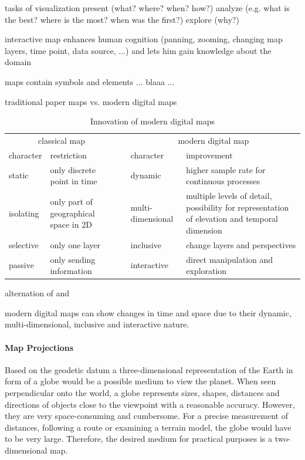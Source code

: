 tasks of visualization
  present (what? where? when? how?)
  analyze (e.g. what is the best? where is the most? when was the first?)
  explore (why?)

interactive map enhances human cognition (panning, zooming, changing map layers, time point, data source, ...) and lets him gain knowledge about the domain

maps contain symbols and elements
  ... blaaa ...

traditional paper maps vs. modern digital maps
\begin{table}[ht]
\centering
\begin{tabular}{llp{1em}ll}
    \toprule
    \multicolumn{2}{c}{classical map} & & \multicolumn{2}{c}{modern digital map} \\
    character & restriction & & character & improvement \\
    \midrule
    static & only discrete point in time & & dynamic & higher sample rate for continuous processes \\
    isolating & only part of geographical space in 2D & & multi-dimensional & multiple levels of detail, possibility for representation of elevation and temporal dimension \\
    selective & only one layer & & inclusive & change layers and perspectives \\
    passive & only sending information & & interactive & direct manipulation and exploration \\
    \bottomrule
\end{tabular}
\caption{Innovation of modern digital maps}
\small{alternation of \cite{karcher} and \cite[p. 145]{ott2001time}}
\label{tab:maps_restrictions}
\end{table}

modern digital maps can show changes in time and space due to their dynamic, multi-dimensional, inclusive and interactive nature.


\paragraph{Map Projections} %
\label{par:map_projections}

Based on the geodetic datum a three-dimensional representation of the Earth in form of a globe would be a possible medium to view the planet. When seen perpendicular onto the world, a globe represents sizes, shapes, distances and directions of objects close to the viewpoint with a reasonable accuracy. However, they are very space-consuming and cumbersome. For a precise measurement of distances, following a route or examining a terrain model, the globe would have to be very large. Therefore, the desired medium for practical purposes is a two-dimensional map.

